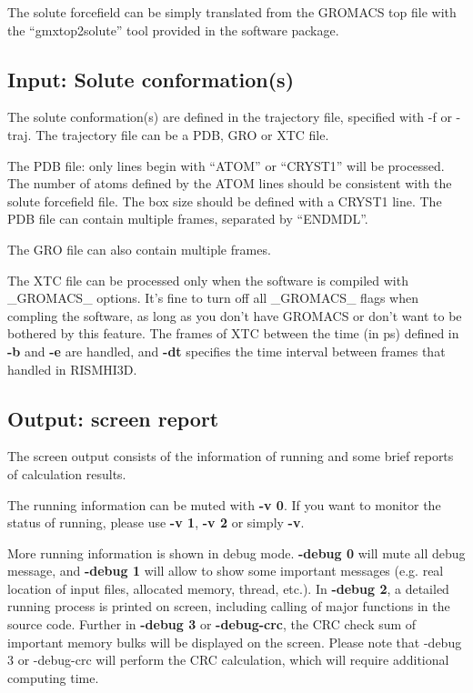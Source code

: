 \documentclass[aip,amsmath,amssymb,reprint,onecolumn]{revtex4-1}
\begin{document}
The solute forcefield can be simply translated from the GROMACS top file with the ``gmxtop2solute'' tool provided in the software package.


\subsection{Input: Solute conformation(s)}\label{sec:io.traj}

The solute conformation(s) are defined in the trajectory file, specified with -f or -traj. The trajectory file can be a PDB, GRO or XTC file.

The PDB file: only lines begin with ``ATOM'' or ``CRYST1'' will be processed. The number of atoms defined by the ATOM lines should be consistent with the solute forcefield file. The box size should be defined with a CRYST1 line. The PDB file can contain multiple frames, separated by ``ENDMDL''.

The GRO file can also contain multiple frames.

The XTC file can be processed only when the software is compiled with \_GROMACS\_ options. It's fine to turn off all \_GROMACS\_ flags when compling the software, as long as you don't have GROMACS or don't want to be bothered by this feature. The frames of XTC between the time (in ps) defined in {\bf -b} and {\bf -e} are handled, and {\bf -dt} specifies the time interval between frames that handled in RISMHI3D.


\subsection{Output: screen report}\label{sec:io.screen}

The screen output consists of the information of running and some brief reports of calculation results.

The running information can be muted with {\bf -v 0}. If you want to monitor the status of running, please use {\bf -v 1}, {\bf -v 2} or simply {\bf -v}.

More running information is shown in debug mode. {\bf -debug 0} will mute all debug message, and {\bf -debug 1} will allow to show some important messages (e.g. real location of input files, allocated memory, thread, etc.). In {\bf -debug 2}, a detailed running process is printed on screen, including calling of major functions in the source code. Further in {\bf -debug 3} or {\bf -debug-crc}, the CRC check sum of important memory bulks will be displayed on the screen. Please note that -debug 3 or -debug-crc will perform the CRC calculation, which will require additional computing time.
\end{document}
